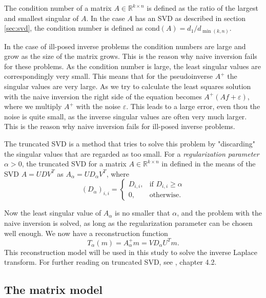 \documentclass[12pt,a4]{article}
\newcommand{\R}{{\mathbb R}}
\newcommand{\eps}{\varepsilon}
\newcommand{\cond}{\ensuremath{\text{cond}}}
\begin{document}
The condition number of a matrix $A \in \R^{k \times n}$ is defined as the ratio of the largest and smallest singular of $A$. In the case $A$ has an SVD as described in section \ref{sec:svd}, the condition number is defined as $\cond(A) = d_1 / d_{\min(k,n)}$.

In the case of ill-posed inverse problems the condition numbers are large and grow as the size of the matrix grows. This is the reason why naive inversion fails for these problems. As the condition number is large, the least singular values are correspondingly very small. This means that for the pseudoinverse $A^+$ the singular values are very large. As we try to calculate the least squares solution with the naive inversion the right side of the equation becomes $A^+ (Af + \eps)$, where we multiply $A^+$ with the noise $\eps$. This leads to a large error, even thou the noise is quite small, as the inverse singular values are often very much larger. This is the reason why naive inversion fails for ill-posed inverse problems.

The truncated SVD is a method that tries to solve this problem by "discarding" the singular values that are regarded as too small. For a \emph{regularization parameter} $\alpha > 0$, the truncated SVD for a matrix $A \in \R^{k \times n}$ in defined in the means of the SVD $A = U D V^T$ as $A_{\alpha} = U D_{\alpha} V^T$, where
\begin{equation}
(D_{\alpha})_{i,i} =
\begin{cases}
D_{i,i}, & \text{if } D_{i,i} \geq \alpha \\
0,       & \text{otherwise}.
\end{cases}
\end{equation}

Now the least singular value of $A_{\alpha}$ is no smaller that $\alpha$, and the problem with the naive inversion is solved, as long as the regularization parameter can be chosen well enough. We now have a reconstruction function
\begin{equation}
T_{\alpha}(m) = A_{\alpha}^+ m = V D_{\alpha} U^T m.
\end{equation}
This reconstruction model will be used in this study to solve the inverse Laplace transform. For further reading on truncated SVD, see \cite{samu}, chapter 4.2.



\subsection{The matrix model}\label{sec:matrixmodel}
\end{document}
